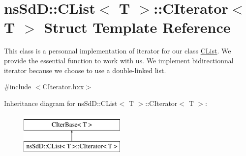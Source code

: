 \hypertarget{structnsSdD_1_1CList_1_1CIterator}{\section{ns\+Sd\+D\+:\+:C\+List$<$ T $>$\+:\+:C\+Iterator$<$ T $>$ Struct Template Reference}
\label{structnsSdD_1_1CList_1_1CIterator}
}


This class is a personnal implementation of iterator for our class \hyperlink{classnsSdD_1_1CList}{C\+List}. We provide the essential function to work with us. We implement bidirectionnal iterator because we choose to use a double-\/linked list.  




{\ttfamily \#include $<$C\+Iterator.\+hxx$>$}

Inheritance diagram for ns\+Sd\+D\+:\+:C\+List$<$ T $>$\+:\+:C\+Iterator$<$ T $>$\+:\begin{figure}[H]
\begin{center}
\leavevmode
\includegraphics[height=2.000000cm]{structnsSdD_1_1CList_1_1CIterator}
\end{center}
\end{figure}
